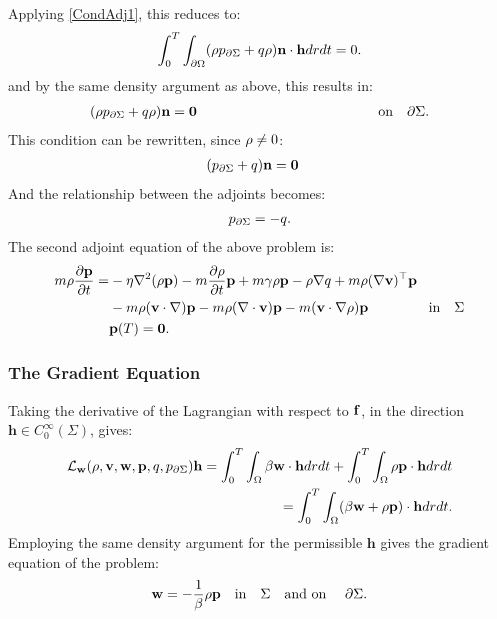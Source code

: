 Applying \ref{CondAdj1}, this reduces to:
\begin{align*}
\int_0^T \int_{\partial\Omega} (\rho  {p}_{\partial \Sigma} + q \rho)  \mathbf{n}\cdot \mathbf{h} dr dt=0.
\end{align*}
and by the same density argument as above, this results in:
\begin{align*}
(\rho  {p}_{\partial \Sigma} + q \rho)  \mathbf{n} =\mathbf{0} \qquad \qquad\qquad\qquad\qquad\qquad \quad \text{on} \quad \partial \Sigma.
\end{align*}
This condition can be rewritten, since $\rho \neq 0$:
\begin{align*}
&( {p}_{\partial \Sigma} + q ) \mathbf{n} =\mathbf{0}
\end{align*}
And the relationship between the adjoints becomes:
\begin{align*}
{p}_{\partial \Sigma} = -q.
\end{align*}
The second adjoint equation of the above problem is:
\begin{align*}
  m\rho \frac{\partial \mathbf{p}}{\partial t} =& - \eta \nabla^2 (\rho \mathbf{p}) - m \frac{\partial \rho}{\partial t} \mathbf{p}   +m \gamma \rho \mathbf{p}-\rho\nabla q +m \rho (\nabla \mathbf{v})^\top\mathbf{p} \\
&-m \rho (\mathbf{v} \cdot \nabla)\mathbf{p} - m \rho (\nabla \cdot \mathbf{v})\mathbf{p}  - m (\mathbf{v} \cdot \nabla \rho)\mathbf{p}  \ \qquad\qquad \text{in} \quad \Sigma\\
&\mathbf{p}(T)=\mathbf{0}.
\end{align*}

\subsubsection{The Gradient Equation}
Taking the derivative of the Lagrangian with respect to $\mathbf{f}$, in the direction $\mathbf{h} \in C_0^\infty(\Sigma)$, gives:
\begin{align*}
\mathcal{L}_{\mathbf{w}}(\rho,\mathbf{v},\mathbf{w},\mathbf{p},q,{p}_{\partial \Sigma}) \mathbf{h}= \int_0^T \int_\Omega \beta \mathbf{w} \cdot \mathbf{h} dr dt + \int_0^T \int_\Omega \rho \mathbf{p} \cdot \mathbf{h} dr dt \\
= \int_0^T \int_\Omega ( \beta \mathbf{w} + \rho \mathbf{p}) \cdot \mathbf{h} dr dt.
\end{align*}
Employing the same density argument for the permissible $\mathbf{h}$ gives the gradient equation of the problem:
\begin{align*}
 \mathbf{w} = - \frac{1}{\beta} \rho \mathbf{p} \quad \text{in} \quad \Sigma \quad \text{and on } \quad \partial\Sigma.
\end{align*}

